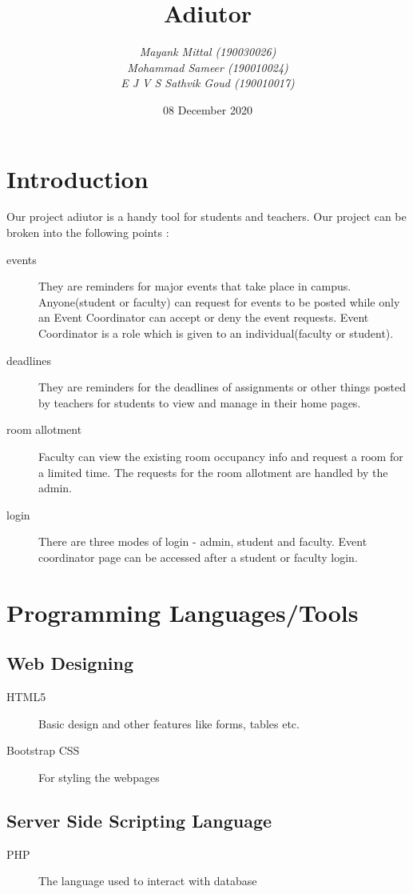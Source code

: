 \documentclass{article}
\title{\textbf{Adiutor}}
\author{\emph{Mayank Mittal (190030026)} \\ \emph{Mohammad Sameer (190010024)}\\ \emph{E J V S Sathvik Goud (190010017)}}
\date{08 December 2020}
\begin{document}
\maketitle

\section{Introduction}
Our project adiutor is a handy tool for students and teachers. Our project can be broken into the following points : 
\begin{description}
    \item[events] They are reminders for major events that take place in campus. Anyone(student or faculty) can request for events to be posted while only an Event Coordinator can accept or deny the event requests. Event Coordinator is a role which is given to an individual(faculty or student).
    \item [deadlines] They are reminders for the deadlines of assignments or other things posted by teachers for students to view and manage in their home pages.
    \item [room allotment] Faculty can view the existing room occupancy info  and request a room for a limited time. The requests for the room allotment are handled by the admin.
    \item [login] There are three modes of login - admin, student and faculty. Event coordinator page can be accessed after a student or faculty login.
\end{description}

\section{Programming Languages/Tools}
\subsection{Web Designing}
\begin{description}
    \item[HTML5] Basic design and other features like forms, tables etc.
    \item[Bootstrap CSS] For styling the webpages
\end{description}

\subsection{Server Side Scripting Language}
\begin{description}
    \item[PHP] The language used to interact with database
\end{description}
\end{document}
